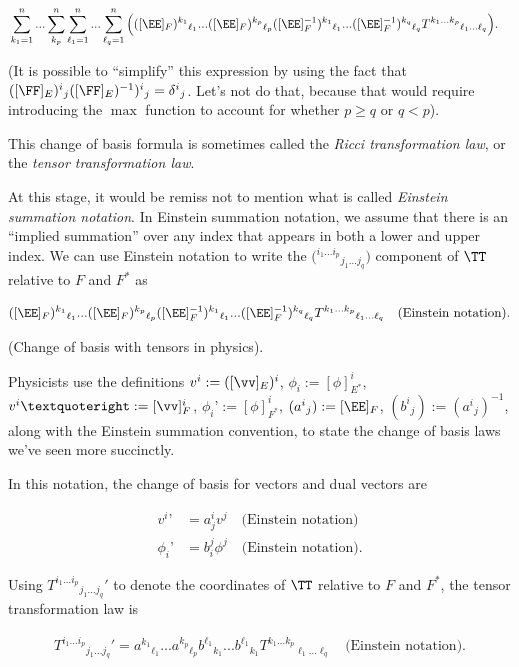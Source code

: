 \begin{theorem}
    \begin{align*}
        &\sum_{k_1 = 1}^n ... \sum_{k_p}^n \sum_{\ell_1 = 1}^n ... \sum_{\ell_q = 1}^n \Big( ([\EE]_F)^{k_1}{}_{\ell_1} ... ([\EE]_F)^{k_p}{}_{\ell_p}
        ([\EE]_F^{-1})^{k_1}{}_{\ell_1} ... ([\EE]_F^{-1})^{k_q}{}_{\ell_q} 
        T^{k_1 ... k_p}{}_{\ell_1 ... \ell_q}\Big).
    \end{align*}
    
    (It is possible to ``simplify'' this expression by using the fact that $([\FF]_E)^i{}_j ([\FF]_E)^{-1})^i{}_j = \delta^i{}_j$. Let's not do that, because that would require introducing the $\max$ function to account for whether $p \geq q$ or $q < p$).
    
    This change of basis formula is sometimes called the \textit{Ricci transformation law}, or the \textit{tensor transformation law}.
    
    At this stage, it would be remiss not to mention what is called \textit{Einstein summation notation}. In Einstein summation notation, we assume that there is an ``implied summation'' over any index that appears in both a lower and upper index. We can use Einstein notation to write the $\Big( {}^{i_1 ... i_p}{}_{j_1 ... j_q} \Big)$ component of $\TT$ relative to $F$ and $F^*$ as
    
    \begin{align*}
        ([\EE]_F)^{k_1}{}_{\ell_1} ... ([\EE]_F)^{k_p}{}_{\ell_p}
        ([\EE]_F^{-1})^{k_1}{}_{\ell_1} ... ([\EE]_F^{-1})^{k_q}{}_{\ell_q} 
        T^{k_1 ... k_p}{}_{\ell_1 ... \ell_q} \quad \text{(Einstein notation)}.
    \end{align*}
\end{theorem}

\begin{remark}
    (Change of basis with tensors in physics).
    
    Physicists use the definitions $v^i := ([\vv]_E)^i$, $\phi_i := [\phi]_{E^*}^i$, $v^i{}’ := [\vv]_F^i$, $\phi_i’ := [\phi]_{F^*}^i$, $(a^i{}_j) := [\EE]_F$, $(b^i{}_j) := (a^i{}_j)^{-1}$, along with the Einstein summation convention, to state the change of basis laws we’ve seen more succinctly.

    In this notation, the change of basis for vectors and dual vectors are 

    \begin{align*}
        v^i{}’ &= a^i_j v^j \quad \text{(Einstein notation)} \\
        \phi_i{}’ &= b^j_i \phi^j \quad \text{(Einstein notation)}.
    \end{align*}

    Using $T^{i_1 ... i_p}{}_{j_1 ... j_q}{}'$ to denote the coordinates of $\TT$ relative to $F$ and $F^*$, the tensor transformation law is

    \begin{align*}
        T^{i_1 ... i_p}{}_{j_1 ... j_q}{}' = a^{k_1}{}_{\ell_1} ... a^{k_p}{}_{\ell_p} b^{\ell_1}{}_{k_1} ... b^{\ell_1}{}_{k_1} T^{k_1 ... k_p}{}_{\ell_1 ... \ell_q} \quad \text{(Einstein notation)}.
    \end{align*}

\end{remark}

